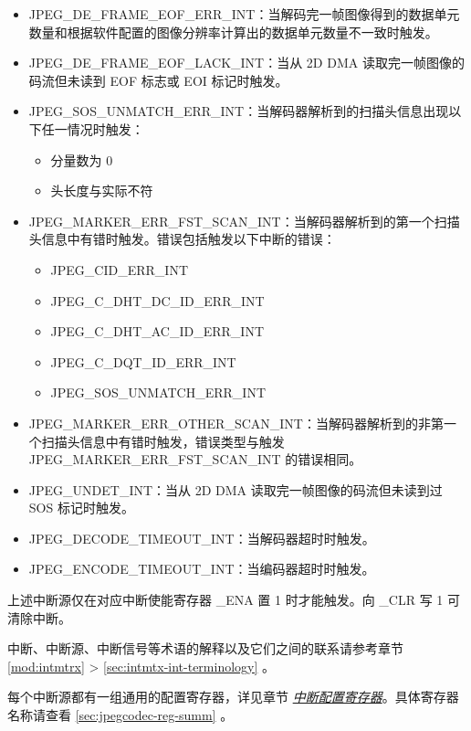 \documentclass[main\_\_CN.tex]{subfiles}
\begin{document}
\begin{itemize}
\item JPEG\_DE\_FRAME\_EOF\_ERR\_INT：当解码完一帧图像得到的数据单元数量和根据软件配置的图像分辨率计算出的数据单元数量不一致时触发。
\item JPEG\_DE\_FRAME\_EOF\_LACK\_INT：当从 2D DMA 读取完一帧图像的码流但未读到 EOF 标志或 EOI 标记时触发。
\item JPEG\_SOS\_UNMATCH\_ERR\_INT：当解码器解析到的扫描头信息出现以下任一情况时触发：
\begin{itemize}
    \item 分量数为 0
    \item 头长度与实际不符
\end{itemize}
\item JPEG\_MARKER\_ERR\_FST\_SCAN\_INT：当解码器解析到的第一个扫描头信息中有错时触发。错误包括触发以下中断的错误：
\begin{itemize}
    \item JPEG\_CID\_ERR\_INT
    \item JPEG\_C\_DHT\_DC\_ID\_ERR\_INT
    \item JPEG\_C\_DHT\_AC\_ID\_ERR\_INT
    \item JPEG\_C\_DQT\_ID\_ERR\_INT
    \item JPEG\_SOS\_UNMATCH\_ERR\_INT
\end{itemize}
\item JPEG\_MARKER\_ERR\_OTHER\_SCAN\_INT：当解码器解析到的非第一个扫描头信息中有错时触发，错误类型与触发 JPEG\_MARKER\_ERR\_FST\_SCAN\_INT 的错误相同。
\item JPEG\_UNDET\_INT：当从 2D DMA 读取完一帧图像的码流但未读到过 SOS 标记时触发。
\item JPEG\_DECODE\_TIMEOUT\_INT：当解码器超时时触发。
\item JPEG\_ENCODE\_TIMEOUT\_INT：当编码器超时时触发。
\end{itemize}

上述中断源仅在对应中断使能寄存器 \_ENA 置 1 时才能触发。向 \_CLR 写 1 可清除中断。

\begin{tiplisting}
中断、中断源、中断信号等术语的解释以及它们之间的联系请参考章节 \ref{mod:intmtrx} \textit{} > \ref{sec:intmtx-int-terminology} \textit{}。
\end{tiplisting}

每个中断源都有一组通用的配置寄存器，详见章节 \hyperref[interrupt-config-registers]{\textit{中断配置寄存器}}。具体寄存器名称请查看 \ref{sec:jpegcodec-reg-summ} \textit{}。
\end{document}
